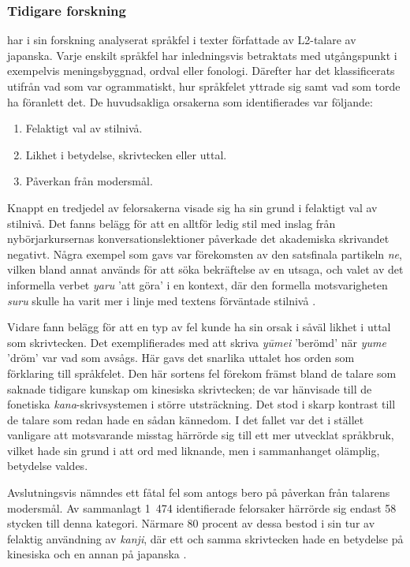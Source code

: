\documentclass[12pt,a4paper]{article}
\begin{document}
\subsubsection{Tidigare forskning}
\label{subsec:Bakgrund: Språkfel: Tidigare forskning}
\textcite{nishina2014} har i sin forskning analyserat språkfel i texter författade av L2-talare av japanska. Varje enskilt språkfel har inledningsvis betraktats med utgångspunkt i exempelvis meningsbyggnad, ordval eller fonologi. Därefter har det klassificerats utifrån vad som var ogrammatiskt, hur språkfelet yttrade sig samt vad som torde ha föranlett det. De huvudsakliga orsakerna som identifierades var följande:

\begin{enumerate}
\item Felaktigt val av stilnivå.
\item Likhet i betydelse, skrivtecken eller uttal.
\item Påverkan från modersmål.
\end{enumerate}

Knappt en tredjedel av felorsakerna visade sig ha sin grund i felaktigt val av stilnivå. Det fanns belägg för att en alltför ledig stil med inslag från nybörjarkursernas konversationslektioner påverkade det akademiska skrivandet negativt. Några exempel som gavs var förekomsten av den satsfinala partikeln \emph{ne}, vilken bland annat används för att söka bekräftelse av en utsaga, och valet av det informella verbet \emph{yaru} 'att göra' i en kontext, där den formella motsvarigheten \emph{suru} skulle ha varit mer i linje med textens förväntade stilnivå \autocite{nishina2014}.

Vidare fann \textcite{nishina2014} belägg för att en typ av fel kunde ha sin orsak i såväl likhet i uttal som skrivtecken. Det exemplifierades med att skriva \emph{y\=umei} 'berömd' när \emph{yume} 'dröm' var vad som avsågs. Här gavs det snarlika uttalet hos orden som förklaring till språkfelet. Den här sortens fel förekom främst bland de talare som saknade tidigare kunskap om kinesiska skrivtecken; de var hänvisade till de fonetiska \emph{kana}-skrivsystemen i större utsträckning. Det stod i skarp kontrast till de talare som redan hade en sådan kännedom. I det fallet var det i stället vanligare att motsvarande misstag härrörde sig till ett mer utvecklat språkbruk, vilket hade sin grund i att ord med liknande, men i sammanhanget olämplig, betydelse valdes.

Avslutningsvis nämndes ett fåtal fel som antogs bero på påverkan från talarens modersmål. Av sammanlagt 1~474 identifierade felorsaker härrörde sig endast 58 stycken till denna kategori. Närmare 80 procent av dessa bestod i sin tur av felaktig användning av \emph{kanji}, där ett och samma skrivtecken hade en betydelse på kinesiska och en annan på japanska \autocite{nishina2014}.
\end{document}
